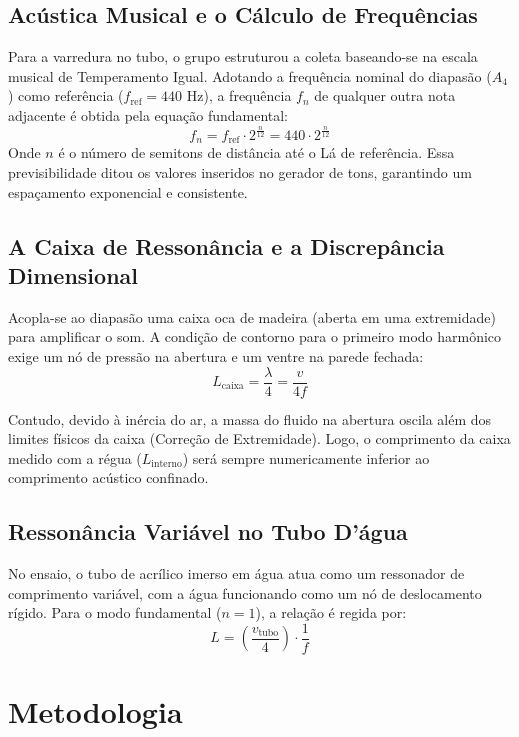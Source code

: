 \documentclass[12pt,a4paper]{article}
\begin{document}
\subsection{Acústica Musical e o Cálculo de Frequências}
Para a varredura no tubo, o grupo estruturou a coleta baseando-se na escala musical de Temperamento Igual. Adotando a frequência nominal do diapasão ($A_4$) como referência ($f_{\text{ref}} = 440\text{ Hz}$), a frequência $f_n$ de qualquer outra nota adjacente é obtida pela equação fundamental:
\begin{equation}
    f_n = f_{\text{ref}} \cdot 2^{\frac{n}{12}} = 440 \cdot 2^{\frac{n}{12}}
\end{equation}
Onde $n$ é o número de semitons de distância até o Lá de referência. Essa previsibilidade ditou os valores inseridos no gerador de tons, garantindo um espaçamento exponencial e consistente.

\subsection{A Caixa de Ressonância e a Discrepância Dimensional}
Acopla-se ao diapasão uma caixa oca de madeira (aberta em uma extremidade) para amplificar o som. A condição de contorno para o primeiro modo harmônico exige um nó de pressão na abertura e um ventre na parede fechada:
\begin{equation}
    L_{\text{caixa}} = \frac{\lambda}{4} = \frac{v}{4f}
\end{equation}

Contudo, devido à inércia do ar, a massa do fluido na abertura oscila além dos limites físicos da caixa (Correção de Extremidade). Logo, o comprimento da caixa medido com a régua ($L_{\text{interno}}$) será sempre numericamente inferior ao comprimento acústico confinado.

\subsection{Ressonância Variável no Tubo D'água}
No ensaio, o tubo de acrílico imerso em água atua como um ressonador de comprimento variável, com a água funcionando como um nó de deslocamento rígido. Para o modo fundamental ($n=1$), a relação é regida por:
\begin{equation}
    L = \left(\frac{v_{\text{tubo}}}{4}\right) \cdot \frac{1}{f}
\end{equation}

\section{Metodologia}
\end{document}
